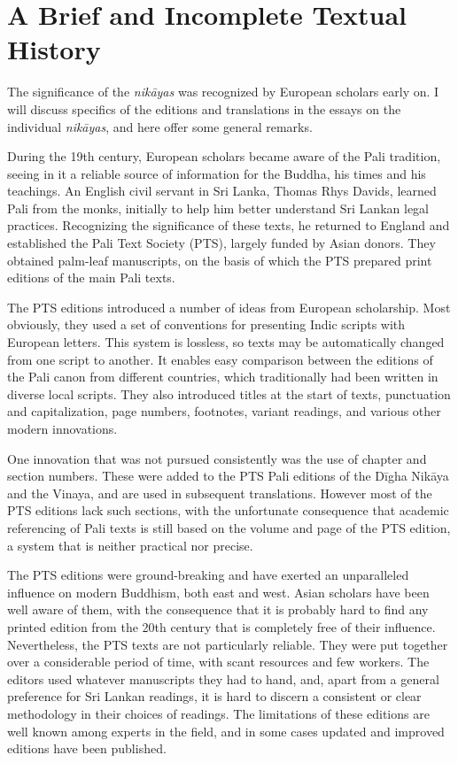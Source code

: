 \documentclass[12pt,openany]{book}%
\begin{document}
\section*{A Brief and Incomplete Textual History}

The significance of the \textit{\textsanskrit{nikāyas}} was recognized by European scholars early on. I will discuss specifics of the editions and translations in the essays on the individual \textit{\textsanskrit{nikāyas}}, and here offer some general remarks.

During the 19th century, European scholars became aware of the Pali tradition, seeing in it a reliable source of information for the Buddha, his times and his teachings. An English civil servant in Sri Lanka, Thomas Rhys Davids, learned Pali from the monks, initially to help him better understand Sri Lankan legal practices. Recognizing the significance of these texts, he returned to England and established the Pali Text Society (PTS), largely funded by Asian donors. They obtained palm-leaf manuscripts, on the basis of which the PTS prepared print editions of the main Pali texts.

The PTS editions introduced a number of ideas from European scholarship. Most obviously, they used a set of conventions for presenting Indic scripts with European letters. This system is lossless, so texts may be automatically changed from one script to another. It enables easy comparison between the editions of the Pali canon from different countries, which traditionally had been written in diverse local scripts. They also introduced titles at the start of texts, punctuation and capitalization, page numbers, footnotes, variant readings, and various other modern innovations.

One innovation that was not pursued consistently was the use of chapter and section numbers. These were added to the PTS Pali editions of the \textsanskrit{Dīgha} \textsanskrit{Nikāya} and the Vinaya, and are used in subsequent translations. However most of the PTS editions lack such sections, with the unfortunate consequence that academic referencing of Pali texts is still based on the volume and page of the PTS edition, a system that is neither practical nor precise.

The PTS editions were ground-breaking and have exerted an unparalleled influence on modern Buddhism, both east and west. Asian scholars have been well aware of them, with the consequence that it is probably hard to find any printed edition from the 20th century that is completely free of their influence. Nevertheless, the PTS texts are not particularly reliable. They were put together over a considerable period of time, with scant resources and few workers. The editors used whatever manuscripts they had to hand, and, apart from a general preference for Sri Lankan readings, it is hard to discern a consistent or clear methodology in their choices of readings. The limitations of these editions are well known among experts in the field, and in some cases updated and improved editions have been published.
\end{document}
